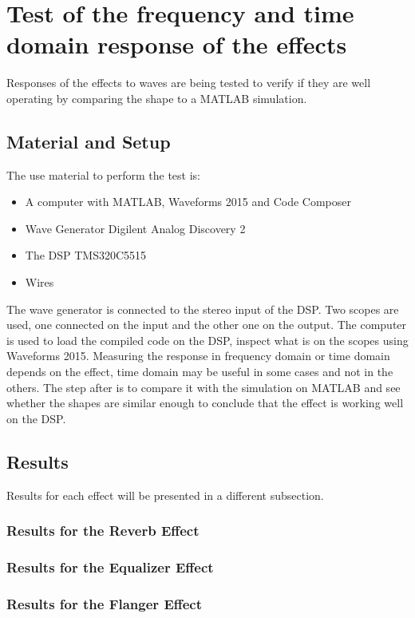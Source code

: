 \chapter{Test of the frequency and time domain response of the effects}

Responses of the effects to waves are being tested to verify if they are well operating by comparing the shape to a MATLAB simulation. 

\section{Material and Setup}

The use material to perform the test is:

\begin{itemize}
	\item A computer with MATLAB, Waveforms 2015 and Code Composer
	\item Wave Generator Digilent Analog Discovery 2
	\item The DSP TMS320C5515
	\item Wires
\end{itemize}

The wave generator is connected to the stereo input of the DSP. Two scopes are used, one connected on the input and the other one on the output. The computer is used to load the compiled code on the DSP, inspect what is on the scopes using Waveforms 2015. 
Measuring the response in frequency domain or time domain depends on the effect, time domain may be useful in some cases and not in the others. 
The step after is to compare it with the simulation on MATLAB and see whether the shapes are similar enough to conclude that the effect is working well on the DSP. 

\section{Results}

Results for each effect will be presented in a different subsection. 

\subsection{Results for the Reverb Effect}






\subsection{Results for the Equalizer Effect}


\subsection{Results for the Flanger Effect}
